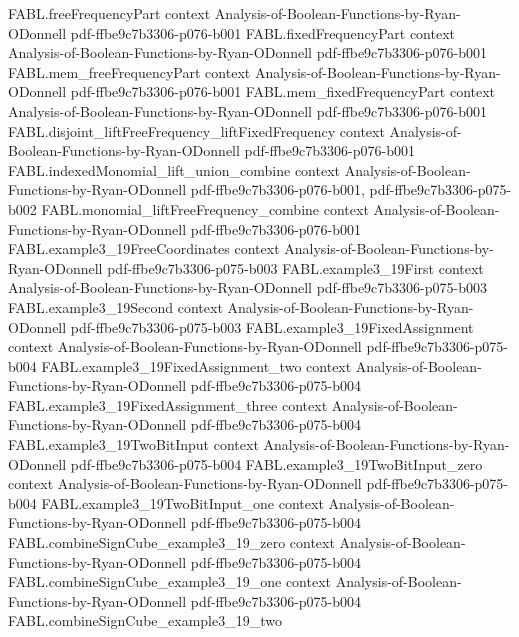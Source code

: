 \begin{theorem}
\proofstep
  {FABL.freeFrequencyPart}
  {context}
  {Analysis-of-Boolean-Functions-by-Ryan-ODonnell}
  {pdf-ffbe9c7b3306-p076-b001}
\proofstep
  {FABL.fixedFrequencyPart}
  {context}
  {Analysis-of-Boolean-Functions-by-Ryan-ODonnell}
  {pdf-ffbe9c7b3306-p076-b001}
\proofstep
  {FABL.mem_freeFrequencyPart}
  {context}
  {Analysis-of-Boolean-Functions-by-Ryan-ODonnell}
  {pdf-ffbe9c7b3306-p076-b001}
\proofstep
  {FABL.mem_fixedFrequencyPart}
  {context}
  {Analysis-of-Boolean-Functions-by-Ryan-ODonnell}
  {pdf-ffbe9c7b3306-p076-b001}
\proofstep
  {FABL.disjoint_liftFreeFrequency_liftFixedFrequency}
  {context}
  {Analysis-of-Boolean-Functions-by-Ryan-ODonnell}
  {pdf-ffbe9c7b3306-p076-b001}
\proofstep
  {FABL.indexedMonomial_lift_union_combine}
  {context}
  {Analysis-of-Boolean-Functions-by-Ryan-ODonnell}
  {pdf-ffbe9c7b3306-p076-b001,
    pdf-ffbe9c7b3306-p075-b002}
\proofstep
  {FABL.monomial_liftFreeFrequency_combine}
  {context}
  {Analysis-of-Boolean-Functions-by-Ryan-ODonnell}
  {pdf-ffbe9c7b3306-p076-b001}
\proofstep
  {FABL.example3_19FreeCoordinates}
  {context}
  {Analysis-of-Boolean-Functions-by-Ryan-ODonnell}
  {pdf-ffbe9c7b3306-p075-b003}
\proofstep
  {FABL.example3_19First}
  {context}
  {Analysis-of-Boolean-Functions-by-Ryan-ODonnell}
  {pdf-ffbe9c7b3306-p075-b003}
\proofstep
  {FABL.example3_19Second}
  {context}
  {Analysis-of-Boolean-Functions-by-Ryan-ODonnell}
  {pdf-ffbe9c7b3306-p075-b003}
\proofstep
  {FABL.example3_19FixedAssignment}
  {context}
  {Analysis-of-Boolean-Functions-by-Ryan-ODonnell}
  {pdf-ffbe9c7b3306-p075-b004}
\proofstep
  {FABL.example3_19FixedAssignment_two}
  {context}
  {Analysis-of-Boolean-Functions-by-Ryan-ODonnell}
  {pdf-ffbe9c7b3306-p075-b004}
\proofstep
  {FABL.example3_19FixedAssignment_three}
  {context}
  {Analysis-of-Boolean-Functions-by-Ryan-ODonnell}
  {pdf-ffbe9c7b3306-p075-b004}
\proofstep
  {FABL.example3_19TwoBitInput}
  {context}
  {Analysis-of-Boolean-Functions-by-Ryan-ODonnell}
  {pdf-ffbe9c7b3306-p075-b004}
\proofstep
  {FABL.example3_19TwoBitInput_zero}
  {context}
  {Analysis-of-Boolean-Functions-by-Ryan-ODonnell}
  {pdf-ffbe9c7b3306-p075-b004}
\proofstep
  {FABL.example3_19TwoBitInput_one}
  {context}
  {Analysis-of-Boolean-Functions-by-Ryan-ODonnell}
  {pdf-ffbe9c7b3306-p075-b004}
\proofstep
  {FABL.combineSignCube_example3_19_zero}
  {context}
  {Analysis-of-Boolean-Functions-by-Ryan-ODonnell}
  {pdf-ffbe9c7b3306-p075-b004}
\proofstep
  {FABL.combineSignCube_example3_19_one}
  {context}
  {Analysis-of-Boolean-Functions-by-Ryan-ODonnell}
  {pdf-ffbe9c7b3306-p075-b004}
\proofstep
  {FABL.combineSignCube_example3_19_two}

\end{theorem}
